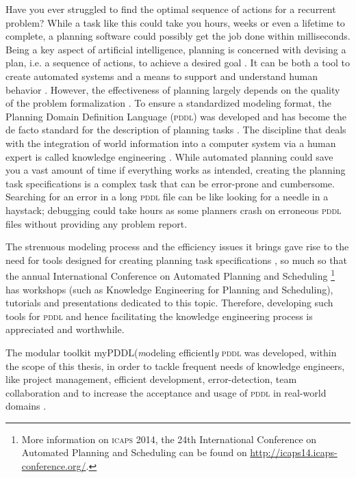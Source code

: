 \documentclass[a4paper,12pt]{report}
\newcommand{\mypddl}{\smallerft[0.8]{myPDDL}\xspace}
\newcommand{\pddl}{\textsc{pddl}\xspace}
\newcommand\smallerft[2][0.85]{{\scalefont{#1}#2}}
\begin{document}
Have you ever struggled to find the optimal sequence of actions for a
recurrent problem? While a task like this could take you hours, weeks
or even a lifetime to complete, a planning software could possibly get
the job done within milliseconds. Being a key aspect of artificial
intelligence, planning is concerned with devising a plan, i.e. a
sequence of actions, to achieve a desired goal
\cite{helmert2008understanding}. It can be both a tool to create
automated systems and a means to support and understand human behavior
\cite{konar1999artificial}. However, the effectiveness of planning
largely depends on the quality of the problem formalization
\cite{shah2013knowledge,keps2014}. To ensure a standardized modeling
format, the Planning Domain Definition Language (\textsc{pddl})
\cite{mcdermott1998pddl} was developed and has become the de facto
standard for the description of planning tasks
\cite{ilghami2005extension}. The discipline that deals with the
integration of world information into a computer system via a human
expert is called knowledge engineering \cite{feigenbaum1983fifth}.
While automated planning could save you a vast amount of time if
everything works as intended, creating the planning task
specifications is a complex task that can be error-prone and
cumbersome. Searching for an error in a long \pddl file can be like
looking for a needle in a haystack; debugging could take hours as some
planners crash on erroneous \pddl files without providing any problem
report.

The strenuous modeling process and the efficiency issues it brings
gave rise to the need for tools designed for creating planning task
specifications \cite{shah2013knowledge}, so much so that the annual
International Conference on Automated Planning and Scheduling \footnote{More information on \textsc{icaps} 2014, the 24th
International Conference on Automated Planning and Scheduling can be
found on \url{http://icaps14.icaps-conference.org/}.} has
workshops (such as Knowledge Engineering for Planning and Scheduling),
tutorials and presentations dedicated to this topic. Therefore,
developing such tools for \pddl and hence facilitating the knowledge
engineering process is appreciated and worthwhile.

The modular toolkit \mypddl (\textit{m}odeling efficientl\textit{y}
\pddl was developed, within the scope of this thesis, in order to
tackle frequent needs of knowledge engineers, like project management,
efficient development, error-detection, team collaboration and to
increase the acceptance and usage of \pddl in real-world domains
\cite{shah2013knowledge,keps2014}.
\end{document}
